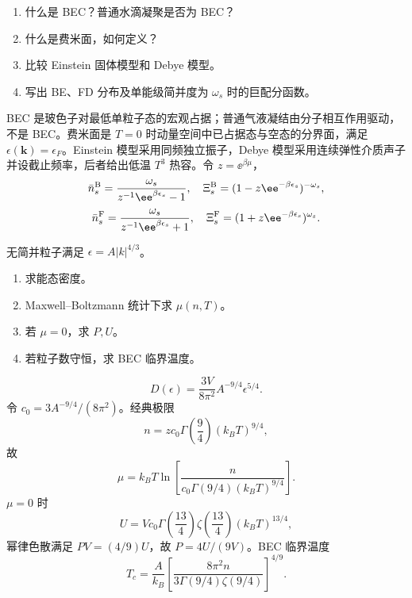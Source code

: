 
\begin{question}
\begin{enumerate}
\item 什么是 BEC？普通水滴凝聚是否为 BEC？
\item 什么是费米面，如何定义？
\item 比较 Einstein 固体模型和 Debye 模型。
\item 写出 BE、FD 分布及单能级简并度为 $\omega_s$ 时的巨配分函数。
\end{enumerate}
\begin{solution}
BEC 是玻色子对最低单粒子态的宏观占据；普通气液凝结由分子相互作用驱动，不是 BEC。费米面是 $T=0$ 时动量空间中已占据态与空态的分界面，满足 $\epsilon(\bm k)=\epsilon_F$。Einstein 模型采用同频独立振子，Debye 模型采用连续弹性介质声子并设截止频率，后者给出低温 $T^3$ 热容。令 $z=\ee^{\beta\mu}$，
\[\bar n_s^{\rm B}=\frac{\omega_s}{z^{-1}\ee^{\beta\epsilon_s}-1},\quad \Xi_s^{\rm B}=(1-z\ee^{-\beta\epsilon_s})^{-\omega_s},\]
\[\bar n_s^{\rm F}=\frac{\omega_s}{z^{-1}\ee^{\beta\epsilon_s}+1},\quad \Xi_s^{\rm F}=(1+z\ee^{-\beta\epsilon_s})^{\omega_s}.\]
\end{solution}
\end{question}

\begin{question}
无简并粒子满足 $\epsilon=A|k|^{4/3}$。
\begin{enumerate}
\item 求能态密度。
\item Maxwell--Boltzmann 统计下求 $\mu(n,T)$。
\item 若 $\mu=0$，求 $P,U$。
\item 若粒子数守恒，求 BEC 临界温度。
\end{enumerate}
\begin{solution}
\[\boxed{D(\epsilon)=\frac{3V}{8\pi^2}A^{-9/4}\epsilon^{5/4}}.\]
令 $c_0=3A^{-9/4}/(8\pi^2)$。经典极限
\[n=z c_0\Gamma\!\left(\frac94\right)(k_BT)^{9/4},\]
故
\[\boxed{\mu=k_BT\ln\!\left[\frac{n}{c_0\Gamma(9/4)(k_BT)^{9/4}}\right]}.\]
$\mu=0$ 时
\[\boxed{U=Vc_0\Gamma\!\left(\frac{13}{4}\right)\zeta\!\left(\frac{13}{4}\right)(k_BT)^{13/4}},\]
幂律色散满足 $PV=(4/9)U$，故 $\boxed{P=4U/(9V)}$。BEC 临界温度
\[\boxed{T_c=\frac{A}{k_B}\left[\frac{8\pi^2n}{3\Gamma(9/4)\zeta(9/4)}\right]^{4/9}}.\]
\end{solution}
\end{question}

